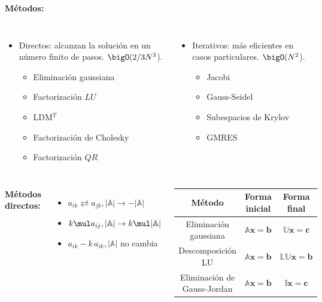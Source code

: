 \documentclass[9pt, aspectratio=169]{beamer}
\begin{document}
\begin{frame}
	\textbf{Métodos:}
	\begin{columns}[t]
		\begin{itemize}
			\item Directos: alcanzan la solución en un número finito de pasos. $\bigO(2/3N^3$).
			      \begin{itemize}
				      \item Eliminación gaussiana
				      \item Factorización $LU$
				      \item LDM$^T$
				      \item Factorización de Cholesky
				      \item Factorización $QR$
			      \end{itemize}
		\end{itemize}
		\begin{itemize}
			\item Iterativos: más eficientes en casos particulares. $\bigO(N^2$).
			      \begin{itemize}
				      \item Jacobi
				      \item Gauss-Seidel
				      \item Subespacios de Krylov
				      \item GMRES
			      \end{itemize}
		\end{itemize}
	\end{columns}
	\pause

	\hrulefill \vspace{1em}
	\begin{columns}[c]
		\textbf{Métodos directos:}
		\begin{itemize}
			\item $a_{ik} \rightleftarrows a_{jk}, |\mathbb{A}| \rightarrow -|\mathbb{A}|$
			\item $k \mul a_{ij}, |\mathbb{A}| \rightarrow k \mul |\mathbb{A}|$
			\item $a_{ik} - k \, a_{ik}, |\mathbb{A}|$ no cambia
		\end{itemize} \pause
		\begin{center}
			\begin{tabular}{c c c}
				\toprule
				\textbf{Método}             & \textbf{Forma inicial}               & \textbf{Forma final}                   \\
				\midrule
				Eliminación gaussiana       & $\mathbb{A} \mathbf{x} = \mathbf{b}$ & $\mathbb{U} \mathbf{x} = \mathbf{c}$   \\
				Descomposición LU           & $\mathbb{A} \mathbf{x} = \mathbf{b}$ & $ \mathbb{LU} \mathbf{x} = \mathbf{b}$ \\
				Eliminación de Gauss-Jordan & $\mathbb{A} \mathbf{x} = \mathbf{b}$ & $\mathbb{I} \mathbf{x} = \mathbf{c}$   \\
				\bottomrule
			\end{tabular}
		\end{center}
	\end{columns}


\end{frame}
\end{document}
